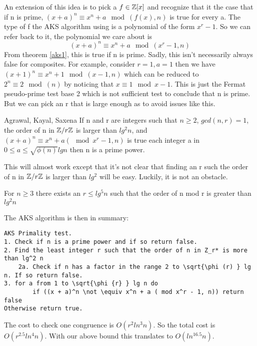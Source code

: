 \documentclass{article}
\begin{document}
An extension of this idea is to pick a $f \in \mathbb{Z} [x]$ and recognize that it the case that if n is prime, $(x+a)^n \equiv x^n + a \mod ( f(x), n)$ is true for every a. The type of f the AKS algorithm using is a polynomial of the form $x^r - 1$. So we can refer back to it, the polynomial we care about is 
\begin{equation}
    \label{aks2}
    (x+a)^n \equiv x^n + a \mod (x^r -1 , n)
\end{equation}
From theorem \ref{aks1}, this is true if n is prime. Sadly, this isn't necessarily always false for composites. For example, consider $r = 1, a = 1$ then we have $(x + 1)^n \equiv x^n + 1 \mod (x - 1, n)$ which can be reduced to $2^n \equiv 2 \mod (n)$ by noticing that $x \equiv 1 \mod x -1$. This is just the Fermat pseudo-prime test base 2 which is not sufficient test to conclude that n is prime. But we can pick an r that is large enough as to avoid issues like this. 

\begin{theorem}{Agrawal, Kayal, Saxena \cite{PrimesP}}
    \label{aks3}
    If n and r are integers such that $n \geq 2$, $gcd(n , r) = 1$, the order of n in $\mathbb{Z} / r \mathbb{Z}$ is larger than $lg^2 n$, and $(x + a)^n \equiv x^n + a ( \mod x^r - 1, n)$ is true each integer a in $ 0 \leq a \leq \sqrt{\phi(n)} lg n$ then n is a prime power. 
\end{theorem}

This will almost work except that it's not clear that finding an r such the order of n in $\mathbb{Z} / r \mathbb{Z}$ is larger than $lg^2$ will be easy. Luckily, it is not an obstacle. 
\begin{theorem}
    For $n \geq 3$ there exists an $r \leq lg^5 n$ such that the order of n mod r is greater than $lg^2 n$
\end{theorem}
The AKS algorithm is then in summary:
\begin{verbatim}
AKS Primality test.
1. Check if n is a prime power and if so return false.
2. Find the least integer r such that the order of n in Z_r* is more than lg^2 n
    2a. Check if n has a factor in the range 2 to \sqrt{\phi (r) } lg n. If so return false.
3. for a from 1 to \sqrt{\phi {r} } lg n do
        if ((x + a)^n \not \equiv x^n + a ( mod x^r - 1, n)) return false
Otherwise return true.
\end{verbatim}
The cost to check one congruence is $O(r^2 ln^3 n)$. So the total cost is $O(r^{2.5} ln^4 n)$. With our above bound this translates to $O(ln^{16.5} n)$. 
\end{document}
